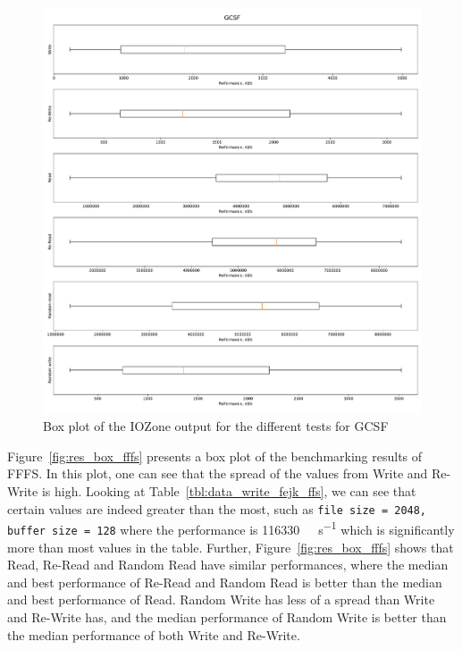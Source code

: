 \begin{figure}[!htb]
	\label{fig:res_box_gcsf}
	\begin{center}
		\includegraphics[width=1.0\textwidth]{figures/benchmarking/gcsf/GCSF-box.pdf}
	\end{center}
	\caption{Box plot of the IOZone output for the different tests for GCSF}
\end{figure}

Figure~\ref{fig:res_box_fffs} presents a box plot of the benchmarking results of FFFS. In this plot, one can see that the spread of the values from Write and Re-Write is high. Looking at Table~\ref{tbl:data_write_fejk_ffs}, we can see that certain values are indeed greater than the most, such as \texttt{file size = 2048, buffer size = 128} where the performance is \SI[per-mode = symbol]{116330}{\kilo\byte\per\second} which is significantly more than most values in the table. Further, Figure~\ref{fig:res_box_fffs} shows that Read, Re-Read and Random Read have similar performances, where the median and best performance of Re-Read and Random Read is better than the median and best performance of Read. Random Write has less of a spread than Write and Re-Write has, and the median performance of Random Write is better than the median performance of both Write and Re-Write.

